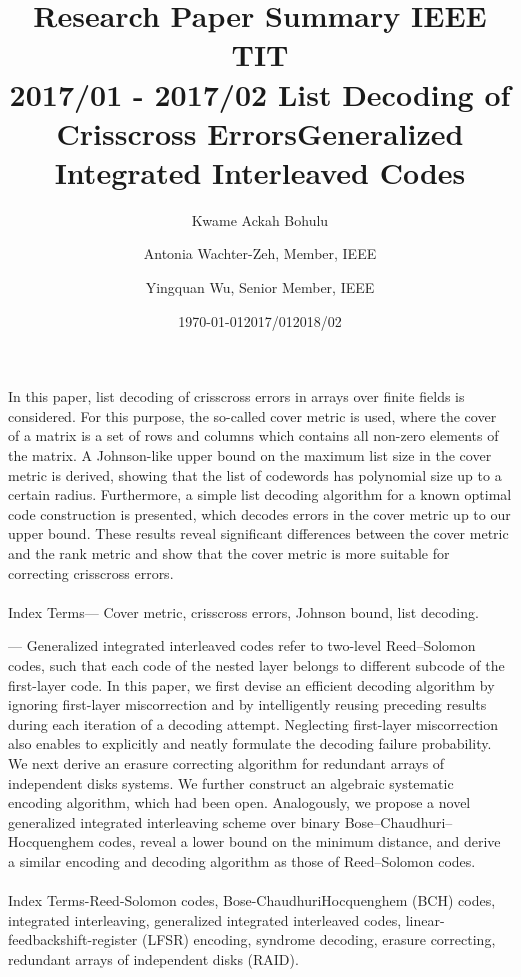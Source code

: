 \documentclass[fontsize=12pt]{article}
\title{Research Paper Summary IEEE TIT \\2017/01 - 2017/02 }
\author{Kwame Ackah Bohulu}
\date{\today}
\begin{document}
\maketitle

\newpage
\title{List Decoding of Crisscross Errors}
\author{Antonia Wachter-Zeh, Member, IEEE}
\date{2017/01}
\maketitle

In this paper, list decoding of crisscross errors in arrays over finite fields is considered. 
For this purpose, the so-called cover metric is used, where the cover of a matrix is a
 set of rows and columns which contains all non-zero elements of the matrix. 
 A Johnson-like upper bound on the maximum list size in the cover metric is derived, 
 showing that the list of codewords has polynomial size up to a certain radius. 
 Furthermore, a simple list decoding algorithm for a known optimal code construction 
 is presented, which decodes errors in the cover metric up to our upper bound. 
 These results reveal significant differences between the cover metric and the rank 
 metric and show that the cover metric is more suitable for correcting crisscross 
 errors.
 

\paragraph{}
Index Terms— Cover metric, crisscross errors, Johnson bound,
list decoding.

\newpage
\title{Generalized Integrated Interleaved Codes}
\author{Yingquan Wu, Senior Member, IEEE}
\date{2018/02}
\maketitle

— Generalized integrated interleaved codes refer to
two-level Reed–Solomon codes, such that each code of the nested
layer belongs to different subcode of the first-layer code. In this
paper, we first devise an efficient decoding algorithm by ignoring
first-layer miscorrection and by intelligently reusing preceding
results during each iteration of a decoding attempt. Neglecting
first-layer miscorrection also enables to explicitly and neatly
formulate the decoding failure probability. We next derive an
erasure correcting algorithm for redundant arrays of independent
disks systems. We further construct an algebraic systematic
encoding algorithm, which had been open. Analogously, we
propose a novel generalized integrated interleaving scheme over
binary Bose–Chaudhuri–Hocquenghem codes, reveal a lower
bound on the minimum distance, and derive a similar encoding
and decoding algorithm as those of Reed–Solomon codes.
\paragraph{}
Index Terms-Reed-Solomon codes, Bose-ChaudhuriHocquenghem
(BCH) codes, integrated interleaving,
generalized integrated interleaved codes, linear-feedbackshift-register
(LFSR) encoding, syndrome decoding, erasure
correcting, redundant arrays of independent disks (RAID).


 
\end{document}
